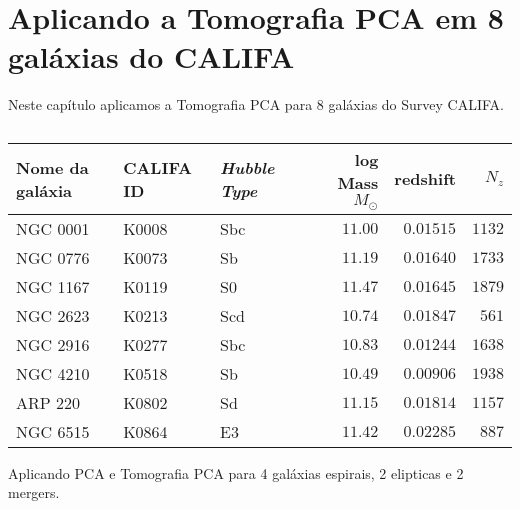 


\chapter{Aplicando a Tomografia PCA em 8 galáxias do CALIFA}
\label{sec:result}

Neste capítulo aplicamos a Tomografia PCA para 8 galáxias do Survey CALIFA.

\begin{table}
	\caption[Relação de galáxias do CALIFA usadas neste trabalho.]
	{}
	\begin{tabular}{l l l r r r}
		Nome da galáxia & CALIFA ID & {\em Hubble Type} & log Mass $M_\odot$ & redshift & $N_z$ \\
		\midrule
		NGC 0001 & K0008 & Sbc & $11.00$ & $0.01515$ & $1132$ \\
		NGC 0776 & K0073 & Sb  & $11.19$ & $0.01640$ & $1733$ \\
		NGC 1167 & K0119 & S0  & $11.47$ & $0.01645$ & $1879$ \\
		NGC 2623 & K0213 & Scd & $10.74$ & $0.01847$ & $561$  \\
		NGC 2916 & K0277 & Sbc & $10.83$ & $0.01244$ & $1638$ \\
		NGC 4210 & K0518 & Sb  & $10.49$ & $0.00906$ & $1938$ \\
		ARP 220  & K0802 & Sd  & $11.15$ & $0.01814$ & $1157$ \\
		NGC 6515 & K0864 & E3  & $11.42$ & $0.02285$ & $887$  \\
	\end{tabular}
	\label{tab:pixelZones}
\end{table}

\ojo
Aplicando PCA e Tomografia PCA para 4 galáxias espirais, 2 elipticas e 2 mergers.


